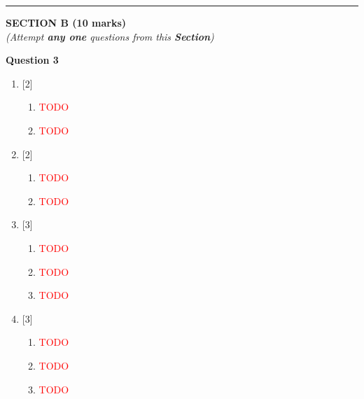 \par\noindent\rule{\textwidth}{0.4pt}
\begin{center}
   \large
   \textbf{SECTION B (10 marks)}\\
   \vspace{5mm}
   \normalsize
   \textit{(Attempt \textbf{any one} questions from this \textbf{Section})}
\end{center}
\par

\noindent
\textbf{Question 3}
\begin{enumerate}[label=(\roman*)]

    \item \hfill [2]
        \begin{enumerate}[label=(\alph*)]
            \item \textcolor{red}{TODO}
            \item \textcolor{red}{TODO}
        \end{enumerate}

    \item \hfill [2]
        \begin{enumerate}[label=(\alph*)]
            \item \textcolor{red}{TODO}
            \item \textcolor{red}{TODO}
        \end{enumerate}

    \item \hfill [3]
        \begin{enumerate}[label=(\alph*)]
            \item \textcolor{red}{TODO}
            \item \textcolor{red}{TODO}
            \item \textcolor{red}{TODO}
        \end{enumerate}

    \item \hfill [3]
        \begin{enumerate}[label=(\alph*)]
            \item \textcolor{red}{TODO}
            \item \textcolor{red}{TODO}
            \item \textcolor{red}{TODO}
        \end{enumerate}

\end{enumerate}

